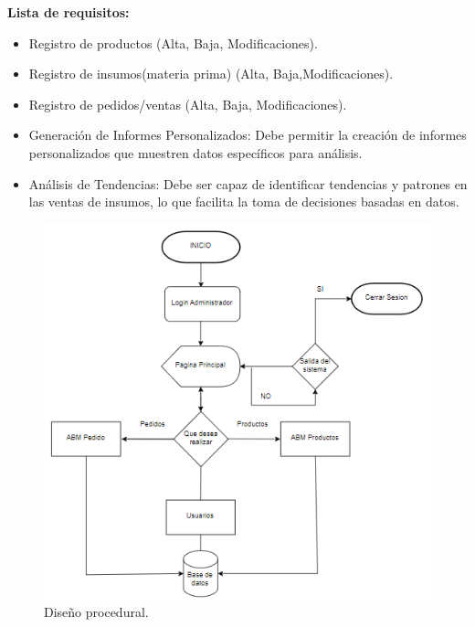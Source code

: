 \textbf{Lista de requisitos:}

\begin{itemize}
\item Registro de productos (Alta, Baja, Modificaciones).
\item Registro de insumos(materia prima) (Alta, Baja,Modificaciones). 
\item Registro de pedidos/ventas (Alta, Baja, Modificaciones).
\item Generación de Informes Personalizados: Debe permitir la creación de informes personalizados que muestren datos específicos para análisis.
\item Análisis de Tendencias: Debe ser capaz de identificar tendencias y patrones en las ventas de insumos, lo que facilita la toma de decisiones basadas en datos.

\end{itemize}
\begin{figure}[H]
    \begin{center}
      \includegraphics[scale=0.90]{./diseño_procedural.png}
      \caption{Diseño procedural.}
      \label{fig:diseño_procedural}
    \end{center}
  \end{figure}
  
